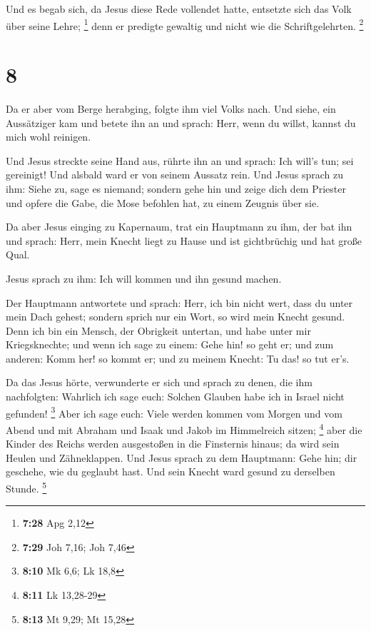  Und es begab sich, da Jesus diese Rede vollendet hatte,
entsetzte sich das Volk über seine Lehre; \footnote{\textbf{7:28} Apg
  2,12}  denn er predigte gewaltig und nicht wie die
Schriftgelehrten. \footnote{\textbf{7:29} Joh 7,16; Joh 7,46}

\hypertarget{section-6}{%
\section{8}\label{section-6}}

 Da er aber vom Berge herabging, folgte ihm viel Volks
nach.  Und siehe, ein Aussätziger kam und betete ihn an
und sprach: Herr, wenn du willst, kannst du mich wohl reinigen.

 Und Jesus streckte seine Hand aus, rührte ihn an und
sprach: Ich will's tun; sei gereinigt! Und alsbald ward er von seinem
Aussatz rein.  Und Jesus sprach zu ihm: Siehe zu, sage es
niemand; sondern gehe hin und zeige dich dem Priester und opfere die
Gabe, die Mose befohlen hat, zu einem Zeugnis über sie.

 Da aber Jesus einging zu Kapernaum, trat ein Hauptmann zu
ihm, der bat ihn  und sprach: Herr, mein Knecht liegt zu
Hause und ist gichtbrüchig und hat große Qual.

 Jesus sprach zu ihm: Ich will kommen und ihn gesund
machen.

 Der Hauptmann antwortete und sprach: Herr, ich bin nicht
wert, dass du unter mein Dach gehest; sondern sprich nur ein Wort, so
wird mein Knecht gesund.  Denn ich bin ein Mensch, der
Obrigkeit untertan, und habe unter mir Kriegsknechte; und wenn ich sage
zu einem: Gehe hin! so geht er; und zum anderen: Komm her! so kommt er;
und zu meinem Knecht: Tu das! so tut er's.

 Da das Jesus hörte, verwunderte er sich und sprach zu
denen, die ihm nachfolgten: Wahrlich ich sage euch: Solchen Glauben habe
ich in Israel nicht gefunden! \footnote{\textbf{8:10} Mk 6,6; Lk 18,8}
 Aber ich sage euch: Viele werden kommen vom Morgen und
vom Abend und mit Abraham und Isaak und Jakob im Himmelreich sitzen;
\footnote{\textbf{8:11} Lk 13,28-29}  aber die Kinder des
Reichs werden ausgestoßen in die Finsternis hinaus; da wird sein Heulen
und Zähneklappen.  Und Jesus sprach zu dem Hauptmann:
Gehe hin; dir geschehe, wie du geglaubt hast. Und sein Knecht ward
gesund zu derselben Stunde. \footnote{\textbf{8:13} Mt 9,29; Mt 15,28}

